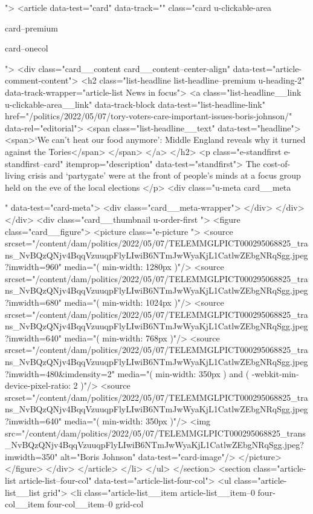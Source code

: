 {{{			
			
			
			
			
			
			
			">
<article data-test="card" data-track="" class="card
			u-clickable-area
			
			
			card--premium
			
			
			
			card--onecol
			
			 ">
<div class="card__content card__content--center-align" data-test="article-comment-content">
<h2 class="list-headline list-headline--premium u-heading-2" data-track-wrapper="article-list News in focus">
<a class="list-headline__link u-clickable-area__link" data-track-block data-test="list-headline-link" href="/politics/2022/05/07/tory-voters-care-important-issues-boris-johnson/" data-rel="editorial">
<span class="list-headline__text" data-test="headline">
<span>‘We can’t heat our food anymore’: Middle England reveals why it turned against the Tories</span>
</span>
</a>
</h2>
<p class="e-standfirst  e-standfirst--card" itemprop="description" data-test="standfirst">
The cost-of-living crisis and ‘partygate’ were at the front of people’s minds at a focus group held on the eve of the local elections
</p>
<div class="u-meta card__meta
						
						
						" data-test="card-meta">
<div class="card__meta-wrapper">
</div>
</div>
</div>
<div class="card__thumbnail u-order-first ">
<figure class="card__figure">
<picture class="e-picture   ">
<source srcset="/content/dam/politics/2022/05/07/TELEMMGLPICT000295068825_trans_NvBQzQNjv4BqqVzuuqpFlyLIwiB6NTmJwWyaKjL1CatlwZEbgNRqSgg.jpeg?imwidth=960" media="( min-width: 1280px )"/>
<source srcset="/content/dam/politics/2022/05/07/TELEMMGLPICT000295068825_trans_NvBQzQNjv4BqqVzuuqpFlyLIwiB6NTmJwWyaKjL1CatlwZEbgNRqSgg.jpeg?imwidth=680" media="( min-width: 1024px )"/>
<source srcset="/content/dam/politics/2022/05/07/TELEMMGLPICT000295068825_trans_NvBQzQNjv4BqqVzuuqpFlyLIwiB6NTmJwWyaKjL1CatlwZEbgNRqSgg.jpeg?imwidth=640" media="( min-width: 768px )"/>
<source srcset="/content/dam/politics/2022/05/07/TELEMMGLPICT000295068825_trans_NvBQzQNjv4BqqVzuuqpFlyLIwiB6NTmJwWyaKjL1CatlwZEbgNRqSgg.jpeg?imwidth=480&imdensity=2" media="( min-width: 350px ) and ( -webkit-min-device-pixel-ratio: 2 )"/>
<source srcset="/content/dam/politics/2022/05/07/TELEMMGLPICT000295068825_trans_NvBQzQNjv4BqqVzuuqpFlyLIwiB6NTmJwWyaKjL1CatlwZEbgNRqSgg.jpeg?imwidth=640" media="( min-width: 350px )"/>
<img src="/content/dam/politics/2022/05/07/TELEMMGLPICT000295068825_trans_NvBQzQNjv4BqqVzuuqpFlyLIwiB6NTmJwWyaKjL1CatlwZEbgNRqSgg.jpeg?imwidth=350" alt="Boris Johnson" data-test="card-image"/>
</picture>
</figure>
</div>
</article>
</li>
</ul>
</section>
<section class="article-list article-list--four-col" data-test="article-list-four-col">
<ul class="article-list__list grid">
<li class="article-list__item article-list__item--0 four-col__item four-col__item--0
			grid-col
			
}}}
